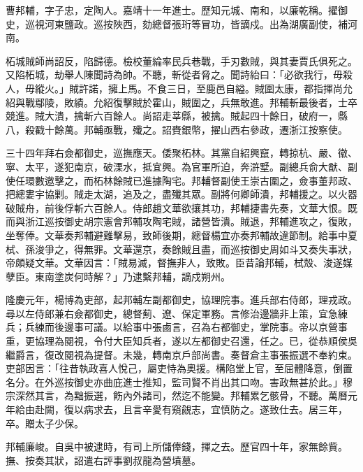 \begin{pinyinscope}
曹邦輔，字子忠，定陶人。嘉靖十一年進士。歷知元城、南和，以廉乾稱。擢御史，巡視河東鹽政。巡按陜西，劾總督張珩等冒功，皆謫戍。出為湖廣副使，補河南。

柘城賊師尚詔反，陷歸德。檢校董綸率民兵巷戰，手刃數賊，與其妻賈氏俱死之。又陷柘城，劫舉人陳聞詩為帥。不聽，斬從者脅之。聞詩紿曰：「必欲我行，毋殺人，毋縱火。」賊許諾，擁上馬。不食三日，至鹿邑自縊。賊圍太康，都指揮尚允紹與戰鄢陵，敗績。允紹復擊賊於霍山，賊圍之，兵無敢進。邦輔斬最後者，士卒競進。賊大潰，擒斬六百餘人。尚詔走莘縣，被擒。賊起四十餘日，破府一，縣八，殺戳十餘萬。邦輔亟戰，殲之。詔賚銀幣，擢山西右參政，遷浙江按察使。

三十四年拜右僉都御史，巡撫應天。倭聚柘林。其黨自紹興竄，轉掠杭、嚴、徽、寧、太平，遂犯南京，破溧水，抵宜興。為官軍所迫，奔滸墅。副總兵俞大猷、副使任環數邀擊之，而柘林餘賊已進據陶宅。邦輔督副使王崇古圍之，僉事董邦政、把總婁宇協剿。賊走太湖，追及之，盡殲其眾。副將何卿師潰，邦輔援之。以火器破賊舟，前後俘斬六百餘人。侍郎趙文華欲攘其功，邦輔捷書先奏，文華大恨。既而與浙江巡按御史胡宗憲會邦輔攻陶宅賊，諸營皆潰。賊退，邦輔進攻之，復敗，坐奪俸。文華奏邦輔避難擊易，致師後期，總督楊宜亦奏邦輔故違節制。給事中夏栻、孫浚爭之，得無罪。文華還京，奏餘賊且盡，而巡按御史周如斗又奏失事狀，帝頗疑文華。文華因言：「賊易滅，督撫非人，致敗。臣昔論邦輔，栻殼、浚遂媒孽臣。東南塗炭何時解？」乃逮繫邦輔，謫戍朔州。

隆慶元年，楊博為吏部，起邦輔左副都御史，協理院事。進兵部右侍郎，理戎政。尋以左侍郎兼右僉都御史，總督薊、遼、保定軍務。言修治邊牆非上策，宜急練兵；兵練而後邊事可議。以給事中張鹵言，召為右都御史，掌院事。帝以京營事重，更協理為閱視，令付大臣知兵者，遂以左都御史召還，任之。已，從恭順侯吳繼爵言，復改閱視為提督。未幾，轉南京戶部尚書。奏督倉主事張振選不奉約束。吏部因言：「往昔執政喜人悅己，屬吏恃為奧援。構陷堂上官，至屈體降意，倒置名分。在外巡按御史亦曲庇進士推知，監司賢不肖出其口吻。害政無甚於此。」穆宗深然其言，為黜振選，飭內外諸司，然迄不能變。邦輔累乞骸骨，不聽。萬曆元年給由赴闕，復以病求去，且言辛愛有窺覦志，宜慎防之。遂致仕去。居三年，卒。贈太子少保。

邦輔廉峻。自吳中被逮時，有司上所儲俸錢，揮之去。歷官四十年，家無餘貲。撫、按奏其狀，詔遣右評事劉叔龍為營墳墓。


\end{pinyinscope}
